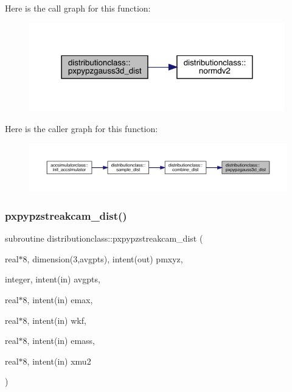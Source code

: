 Here is the call graph for this function\+:\nopagebreak
\begin{figure}[H]
\begin{center}
\leavevmode
\includegraphics[width=315pt]{namespacedistributionclass_a93a16b51a7754d6ec2c99d0a8c4f5ced_cgraph}
\end{center}
\end{figure}
Here is the caller graph for this function\+:\nopagebreak
\begin{figure}[H]
\begin{center}
\leavevmode
\includegraphics[width=350pt]{namespacedistributionclass_a93a16b51a7754d6ec2c99d0a8c4f5ced_icgraph}
\end{center}
\end{figure}
\mbox{\label{namespacedistributionclass_a323470431d5dda05b3dd2ba27cf8565c}} 
\subsubsection{\texorpdfstring{pxpypzstreakcam\_dist()}{pxpypzstreakcam\_dist()}}
{\footnotesize\ttfamily subroutine distributionclass\+::pxpypzstreakcam\+\_\+dist (\begin{DoxyParamCaption}\item[{real$\ast$8, dimension(3,avgpts), intent(out)}]{pmxyz,  }\item[{integer, intent(in)}]{avgpts,  }\item[{real$\ast$8, intent(in)}]{emax,  }\item[{real$\ast$8, intent(in)}]{wkf,  }\item[{real$\ast$8, intent(in)}]{emass,  }\item[{real$\ast$8, intent(in)}]{xmu2 }\end{DoxyParamCaption})}



